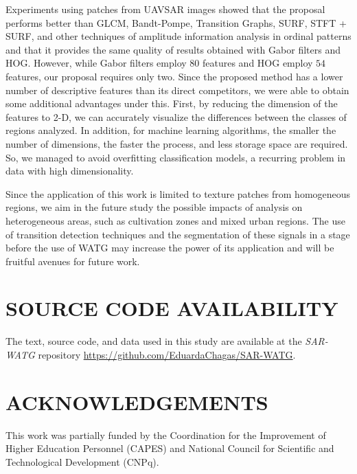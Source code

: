 \documentclass[journal]{IEEEtran}
\begin{document}
	Experiments using patches from UAVSAR images showed that the proposal performs better than GLCM, Bandt-Pompe, Transition Graphs, SURF, STFT + SURF, and other techniques of amplitude information analysis in ordinal patterns and that it provides the same quality of results obtained with Gabor filters and HOG.
	However, while Gabor filters employ $80$ features and HOG employ $54$ features, our proposal requires only two.
	Since the proposed method has a lower number of descriptive features than its direct competitors, we were able to obtain some additional advantages under this.
	First, by reducing the dimension of the features to 2-D, we can accurately visualize the differences between the classes of regions analyzed.
	In addition, for machine learning algorithms, the smaller the number of dimensions, the faster the process, and less storage space are required.
	So, we managed to avoid overfitting classification models, a recurring problem in data with high dimensionality.
	
	Since the application of this work is limited to texture patches from homogeneous regions, we aim in the future study the possible impacts of analysis on heterogeneous areas, such as cultivation zones and mixed urban regions.
	The use of transition detection techniques and the segmentation of these signals in a stage before the use of WATG may increase the power of its application and will be fruitful avenues for future work.
	
	
	\section{SOURCE CODE AVAILABILITY} 
	
	The text, source code, and data used in this study are available at the \textit{SAR-WATG} repository \url{https://github.com/EduardaChagas/SAR-WATG}.
	
	
	
	
	\section*{ACKNOWLEDGEMENTS}\label{ACKNOWLEDGEMENTS}
	
	This work was partially funded by the Coordination for the Improvement of Higher Education Personnel (CAPES) and National Council for Scientific and Technological Development (CNPq).
	
\end{document}
